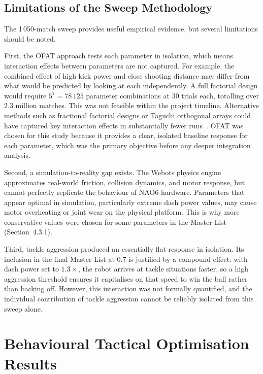 \documentclass[12pt, a4paper]{report}
\begin{document}
\subsection{Limitations of the Sweep Methodology}

The 1\,050-match sweep provides useful empirical evidence, but several
limitations should be noted.

First, the OFAT approach tests each parameter in isolation, which means
interaction effects between parameters are not captured.
For example, the combined effect of high kick power and close shooting
distance may differ from what would be predicted by looking at each
independently.
A full factorial design would require $5^{7} = 78\,125$ parameter
combinations at 30 trials each, totalling over 2.3 million matches. This
was not feasible within the project timeline.
Alternative methods such as fractional factorial designs or Taguchi
orthogonal arrays could have captured key interaction effects in
substantially fewer runs~\cite{montgomery2017}.
OFAT was chosen for this study because it provides a clear, isolated
baseline response for each parameter, which was the primary objective
before any deeper integration analysis.

Second, a simulation-to-reality gap exists.
The Webots physics engine~\cite{webots2024} approximates real-world
friction, collision dynamics, and motor response, but cannot perfectly
replicate the behaviour of NAO6 hardware.
Parameters that appear optimal in simulation, particularly extreme dash
power values, may cause motor overheating or joint wear on the physical
platform.
This is why more conservative values were chosen for some parameters in the
Master List (Section~4.3.1).

Third, tackle aggression produced an essentially flat response in isolation.
Its inclusion in the final Master List at 0.7 is justified by a compound
effect: with dash power set to $1.3\times$, the robot arrives at tackle
situations faster, so a high aggression threshold ensures it capitalises on
that speed to win the ball rather than backing off.
However, this interaction was not formally quantified, and the individual
contribution of tackle aggression cannot be reliably isolated from this
sweep alone.

\section{Behavioural Tactical Optimisation Results}
\end{document}
